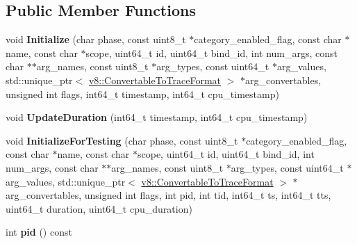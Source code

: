 \subsection*{Public Member Functions}
\begin{DoxyCompactItemize}
\item 
\mbox{\label{classv8_1_1platform_1_1tracing_1_1TraceObject_aaa2b2f4c50e28cd65d2146cbf84f1449}} 
void {\bfseries Initialize} (char phase, const uint8\+\_\+t $\ast$category\+\_\+enabled\+\_\+flag, const char $\ast$name, const char $\ast$scope, uint64\+\_\+t id, uint64\+\_\+t bind\+\_\+id, int num\+\_\+args, const char $\ast$$\ast$arg\+\_\+names, const uint8\+\_\+t $\ast$arg\+\_\+types, const uint64\+\_\+t $\ast$arg\+\_\+values, std\+::unique\+\_\+ptr$<$ \mbox{\hyperlink{classv8_1_1ConvertableToTraceFormat}{v8\+::\+Convertable\+To\+Trace\+Format}} $>$ $\ast$arg\+\_\+convertables, unsigned int flags, int64\+\_\+t timestamp, int64\+\_\+t cpu\+\_\+timestamp)
\item 
\mbox{\label{classv8_1_1platform_1_1tracing_1_1TraceObject_ac7bc3b2b76c56a0c3ac7911ce36174cd}} 
void {\bfseries Update\+Duration} (int64\+\_\+t timestamp, int64\+\_\+t cpu\+\_\+timestamp)
\item 
\mbox{\label{classv8_1_1platform_1_1tracing_1_1TraceObject_ac72dae1918276021f3c747ef2056b710}} 
void {\bfseries Initialize\+For\+Testing} (char phase, const uint8\+\_\+t $\ast$category\+\_\+enabled\+\_\+flag, const char $\ast$name, const char $\ast$scope, uint64\+\_\+t id, uint64\+\_\+t bind\+\_\+id, int num\+\_\+args, const char $\ast$$\ast$arg\+\_\+names, const uint8\+\_\+t $\ast$arg\+\_\+types, const uint64\+\_\+t $\ast$arg\+\_\+values, std\+::unique\+\_\+ptr$<$ \mbox{\hyperlink{classv8_1_1ConvertableToTraceFormat}{v8\+::\+Convertable\+To\+Trace\+Format}} $>$ $\ast$arg\+\_\+convertables, unsigned int flags, int pid, int tid, int64\+\_\+t ts, int64\+\_\+t tts, uint64\+\_\+t duration, uint64\+\_\+t cpu\+\_\+duration)
\item 
\mbox{\label{classv8_1_1platform_1_1tracing_1_1TraceObject_afd37b401fca52334e264fb14e956aa77}} 
int {\bfseries pid} () const
\item 
\mbox{\label{classv8_1_1platform_1_1tracing_1_1TraceObject_abed685a45e1ec0119f296d9dce82e49b}} 

\end{DoxyCompactItemize}

